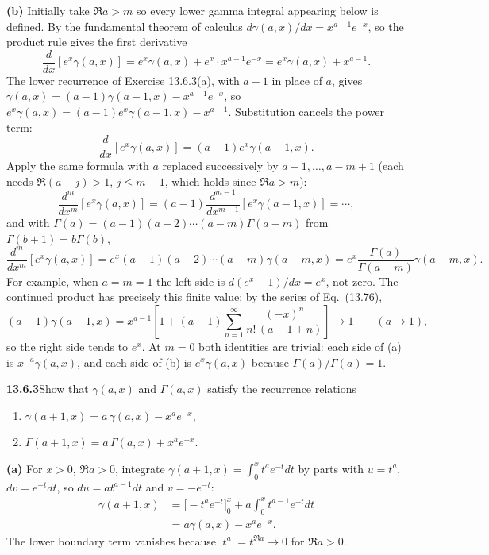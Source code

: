 \textbf{(b)} Initially take $\Re a>m$ so every lower gamma
integral appearing below is defined.  By the fundamental theorem
of calculus $d\gamma(a,x)/dx=x^{a-1}e^{-x}$, so the product rule
gives the first derivative
\[
\frac d{dx}[e^x\gamma(a,x)]
=e^x\gamma(a,x)+e^x\cdot x^{a-1}e^{-x}
=e^x\gamma(a,x)+x^{a-1}.
\]
The lower recurrence of Exercise 13.6.3(a), with $a-1$ in place
of $a$, gives
$\gamma(a,x)=(a-1)\gamma(a-1,x)-x^{a-1}e^{-x}$, so
$e^x\gamma(a,x)=(a-1)e^x\gamma(a-1,x)-x^{a-1}$.
Substitution cancels the power term:
\[
\frac d{dx}[e^x\gamma(a,x)]=(a-1)e^x\gamma(a-1,x).
\]
Apply the same formula with $a$ replaced successively by
$a-1,\ldots,a-m+1$ (each needs $\Re(a-j)>1$, $j\le m-1$, which
holds since $\Re a>m$):
\[
\frac{d^m}{dx^m}[e^x\gamma(a,x)]
=(a-1)\frac{d^{m-1}}{dx^{m-1}}[e^x\gamma(a-1,x)]
=\cdots,
\]
and with $\Gamma(a)=(a-1)(a-2)\cdots(a-m)\Gamma(a-m)$ from
$\Gamma(b+1)=b\Gamma(b)$,
\[
\boxed{\frac{d^m}{dx^m}[e^x\gamma(a,x)]
=e^x(a-1)(a-2)\cdots(a-m)\gamma(a-m,x)
=e^x\frac{\Gamma(a)}{\Gamma(a-m)}\gamma(a-m,x)}.
\]
  For example, when $a=m=1$ the left side is
$d(e^x-1)/dx=e^x$, not zero.  The continued product has precisely
this finite value: by the series of Eq.~(13.76),
\[
(a-1)\gamma(a-1,x)=x^{a-1}\left[1+(a-1)\sum_{n=1}^{\infty}
\frac{(-x)^n}{n!\,(a-1+n)}\right]\longrightarrow1
\qquad(a\to1),
\]
so the right side tends to $e^x$.  At $m=0$ both identities are
trivial: each side of (a) is $x^{-a}\gamma(a,x)$, and each side
of (b) is $e^x\gamma(a,x)$ because $\Gamma(a)/\Gamma(a)=1$.


\par\bigskip
\noindent\textbf{13.6.3}\quad Show that $\gamma(a,x)$ and $\Gamma(a,x)$
satisfy the recurrence relations
\begin{enumerate}
\item[(a)] $\gamma(a+1,x)=a\,\gamma(a,x)-x^{a}e^{-x}$,
\item[(b)] $\Gamma(a+1,x)=a\,\Gamma(a,x)+x^{a}e^{-x}$.
\end{enumerate}
\par\smallskip
{}
\solution
\textbf{(a)} For $x>0$, $\Re a>0$, integrate
$\gamma(a+1,x)=\int_0^x t^ae^{-t}dt$ by parts with
$u=t^a$, $dv=e^{-t}dt$, so $du=at^{a-1}dt$ and $v=-e^{-t}$:
\begin{align*}
\gamma(a+1,x)
&=\bigl[-t^ae^{-t}\bigr]_0^x
+a\int_0^x t^{a-1}e^{-t}dt\\
&=\boxed{a\gamma(a,x)-x^ae^{-x}}.
\end{align*}
The lower boundary term vanishes because $|t^a|=t^{\Re a}\to0$
for $\Re a>0$.

